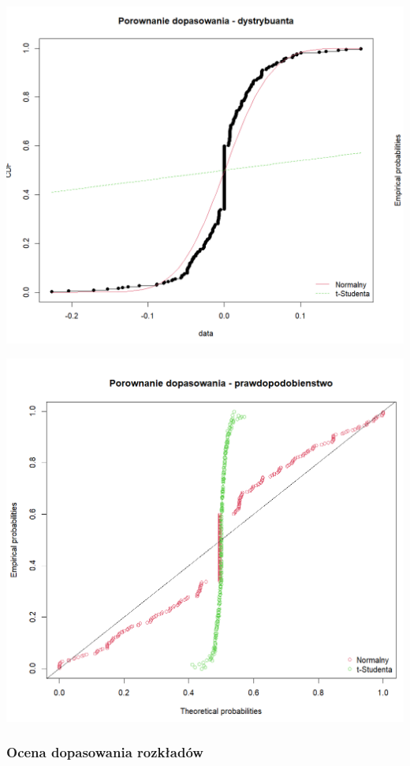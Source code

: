 \documentclass[a4paper,11pt]{article}
\begin{document}
\centerline{\includegraphics[width=14cm]{./Janek/dopasowanie dystrybuanta.png}}
\centerline{\includegraphics[width=14cm]{./Janek/dopasowanie pradopodobienstwo.png}} 

\subsubsection{Ocena dopasowania rozkładów}
\end{document}
